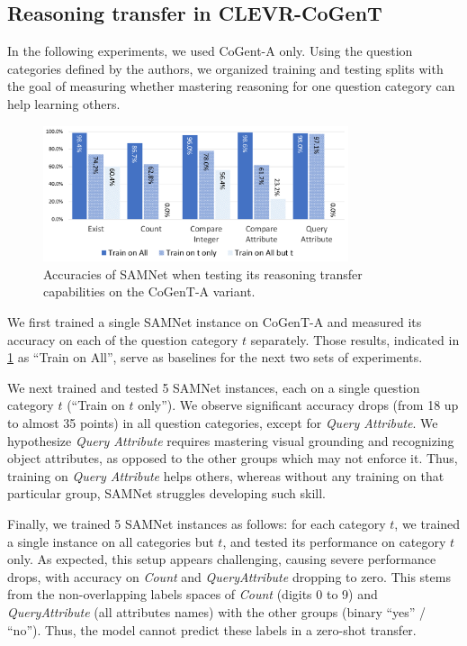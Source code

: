 \subsection{Reasoning transfer in CLEVR-CoGenT}
\label{sec:reasoning-transfer-clevr}
In the following experiments, we used CoGent-A only.
Using the question categories defined by the authors, we organized training and testing splits with the goal of measuring whether mastering reasoning for one question category can help learning others.

\begin{figure}[htbp]
	\centering
	\includegraphics[width=0.8\textwidth]{../img/plots/cogent_reasoning_transfer.pdf}
	\caption{Accuracies of SAMNet when testing its reasoning transfer capabilities on the CoGenT-A variant.}
	\label{fig:cogent_reasoning_transfer}
\end{figure}

We first trained a single SAMNet instance on CoGenT-A and measured its accuracy on each of the question category $t$ separately.
Those results, indicated in \cref{fig:cogent_reasoning_transfer} as ``Train on All'', serve as baselines for the next two sets of experiments.

We next trained and tested 5 SAMNet instances, each on a single question category $t$ (``Train on $t$ only'').
We observe significant accuracy drops (from 18 up to almost 35 points) in all question categories, except for \textit{Query Attribute}.
We hypothesize \textit{Query Attribute} requires mastering visual grounding and recognizing object attributes, as opposed to the other groups which may not enforce it.
Thus, training on \textit{Query Attribute} helps others, whereas without any training on that particular group, SAMNet struggles developing such skill.

Finally, we trained 5 SAMNet instances as follows: for each category $t$, we trained a single instance on all categories but $t$, and tested its performance on
category $t$ only.
As expected, this setup appears challenging, causing severe performance drops, with accuracy on \textit{Count} and \textit{QueryAttribute} dropping to zero.
This stems from the non-overlapping labels spaces of \textit{Count} (digits 0 to 9) and \textit{QueryAttribute} (all attributes names) with the other groups (binary ``yes'' / ``no''). Thus, the model cannot predict these labels in a zero-shot transfer.


